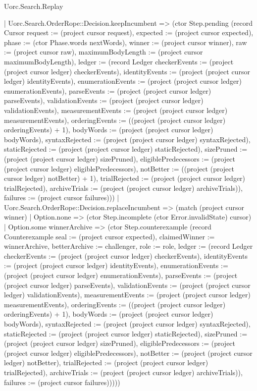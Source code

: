 \begin{lexlean}{Uorc.Search.Replay}
\begin{semanticmodule}
{        | Uorc.Search.OrderRope::Decision.keepIncumbent => (ctor Step.pending (record Cursor {request := (project cursor request), expected := (project cursor expected), phase := (ctor Phase.words nextWords), winner := (project cursor winner), raw := (project cursor raw), maximumBodyLength := (project cursor maximumBodyLength), ledger := (record Ledger {checkerEvents := (project (project cursor ledger) checkerEvents), identityEvents := (project (project cursor ledger) identityEvents), enumerationEvents := (project (project cursor ledger) enumerationEvents), parseEvents := (project (project cursor ledger) parseEvents), validationEvents := (project (project cursor ledger) validationEvents), measurementEvents := (project (project cursor ledger) measurementEvents), orderingEvents := ((project (project cursor ledger) orderingEvents) + 1), bodyWords := (project (project cursor ledger) bodyWords), syntaxRejected := (project (project cursor ledger) syntaxRejected), staticRejected := (project (project cursor ledger) staticRejected), sizePruned := (project (project cursor ledger) sizePruned), eligiblePredecessors := (project (project cursor ledger) eligiblePredecessors), notBetter := ((project (project cursor ledger) notBetter) + 1), trialRejected := (project (project cursor ledger) trialRejected), archiveTrials := (project (project cursor ledger) archiveTrials)}), failures := (project cursor failures)}))
        | Uorc.Search.OrderRope::Decision.replaceIncumbent => (match (project cursor winner)
          | Option.none => (ctor Step.incomplete (ctor Error.invalidState) cursor)
          | Option.some winnerArchive => (ctor Step.counterexample (record Counterexample {seal := (project cursor expected), claimedWinner := winnerArchive, betterArchive := challenger, role := role, ledger := (record Ledger {checkerEvents := (project (project cursor ledger) checkerEvents), identityEvents := (project (project cursor ledger) identityEvents), enumerationEvents := (project (project cursor ledger) enumerationEvents), parseEvents := (project (project cursor ledger) parseEvents), validationEvents := (project (project cursor ledger) validationEvents), measurementEvents := (project (project cursor ledger) measurementEvents), orderingEvents := ((project (project cursor ledger) orderingEvents) + 1), bodyWords := (project (project cursor ledger) bodyWords), syntaxRejected := (project (project cursor ledger) syntaxRejected), staticRejected := (project (project cursor ledger) staticRejected), sizePruned := (project (project cursor ledger) sizePruned), eligiblePredecessors := (project (project cursor ledger) eligiblePredecessors), notBetter := (project (project cursor ledger) notBetter), trialRejected := (project (project cursor ledger) trialRejected), archiveTrials := (project (project cursor ledger) archiveTrials)}), failures := (project cursor failures)}))))
}
\end{semanticmodule}
\end{lexlean}
